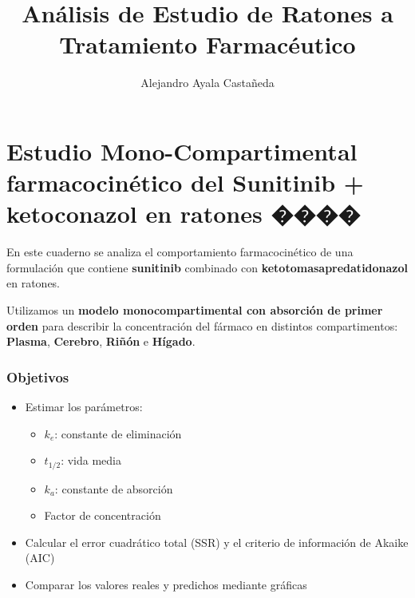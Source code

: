 \documentclass[11pt]{article}
\title{Análisis de Estudio de Ratones a Tratamiento Farmacéutico}
\author{Alejandro Ayala Castañeda}
\providecommand{\tightlist}{%
      \setlength{\itemsep}{0pt}\setlength{\parskip}{0pt}}
\begin{document}
    
    \maketitle
    
    

    
    \section{Estudio Mono-Compartimental farmacocinético del Sunitinib +
ketoconazol en ratones
����}\label{estudio-mono-compartimental-farmacocinuxe9tico-del-sunitinib-ketoconazol-en-ratones}

En este cuaderno se analiza el comportamiento farmacocinético de una
formulación que contiene \textbf{sunitinib} combinado con
\textbf{ketotomasapredatidonazol} en ratones.

Utilizamos un \textbf{modelo monocompartimental con absorción de primer
orden} para describir la concentración del fármaco en distintos
compartimentos: \textbf{Plasma}, \textbf{Cerebro}, \textbf{Riñón} e
\textbf{Hígado}.

\subsubsection{Objetivos}\label{objetivos}

\begin{itemize}
\tightlist
\item
  Estimar los parámetros:

  \begin{itemize}
  \tightlist
  \item
    \(k_e\): constante de eliminación
  \item
    \(t_{1/2}\): vida media
  \item
    \(k_a\): constante de absorción
  \item
    Factor de concentración
  \end{itemize}
\item
  Calcular el error cuadrático total (SSR) y el criterio de información
  de Akaike (AIC)
\item
  Comparar los valores reales y predichos mediante gráficas
\end{itemize}
\end{document}
